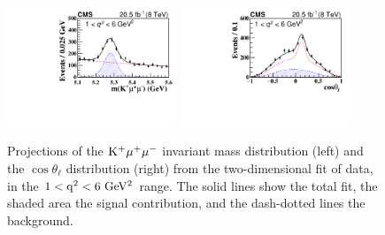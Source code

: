 \documentclass{PoS}
\begin{document}
\begin{figure}[htb]
\centering
\includegraphics[width=0.45\textwidth]{figures/CMS-BPH-15-001_Figure_003-h}
\includegraphics[width=0.45\textwidth]{figures/CMS-BPH-15-001_Figure_004-h}
\caption{
  Projections of the ${\rm K^+\mu^+\mu^-}$ invariant mass distribution (left) and the
  $\cos\theta_\ell$ distribution (right) from the two-dimensional fit of data, in
  the ${\rm 1 < q^2 < 6~GeV^2}$ range. The solid lines show the total fit, the
  shaded area the signal contribution, and the dash-dotted lines the background.
}
\label{fig:BPH-15-001_Figures_003-004}
\end{figure}
\end{document}
